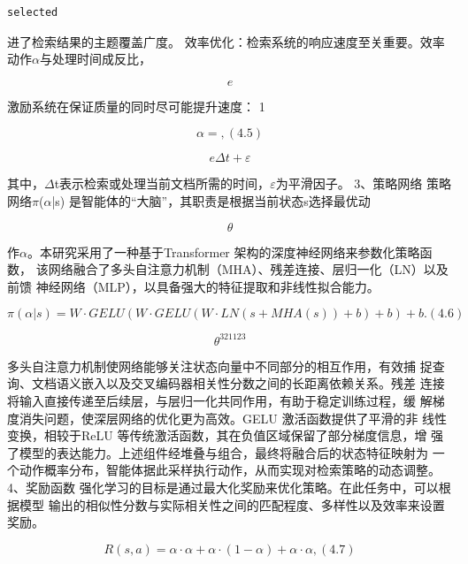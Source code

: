 \documentclass[12pt,a4paper,openright,UTF8]{ctexbook}
\begin{document}
\begin{lstlisting}
selected
\end{lstlisting}
进了检索结果的主题覆盖广度。 效率优化：检索系统的响应速度至关重要。效率动作$\alpha$与处理时间成反比，

\begin{equation*}
e
\end{equation*}

激励系统在保证质量的同时尽可能提升速度： 1

\begin{equation*}
\alpha=,(4.5)
\end{equation*}

\begin{equation*}
e\Delta t+ \varepsilon
\end{equation*}

其中，$\Delta$t表示检索或处理当前文档所需的时间，$\varepsilon$为平滑因子。 3、策略网络 策略网络$\pi$($\alpha$|s) 是智能体的“大脑”，其职责是根据当前状态s选择最优动

\begin{equation*}
\theta
\end{equation*}

作$\alpha$。本研究采用了一种基于Transformer 架构的深度神经网络来参数化策略函数， 该网络融合了多头自注意力机制（MHA）、残差连接、层归一化（LN）以及前馈 神经网络（MLP），以具备强大的特征提取和非线性拟合能力。

\begin{equation*}
\pi(\alpha|s) = W \cdot GELU(W \cdot GELU(W \cdot LN(s+ MHA(s)) + b) + b) + b. (4.6)
\end{equation*}

\begin{equation*}
\theta^321123
\end{equation*}

多头自注意力机制使网络能够关注状态向量中不同部分的相互作用，有效捕 捉查询、文档语义嵌入以及交叉编码器相关性分数之间的长距离依赖关系。残差 连接将输入直接传递至后续层，与层归一化共同作用，有助于稳定训练过程，缓 解梯度消失问题，使深层网络的优化更为高效。GELU 激活函数提供了平滑的非 线性变换，相较于ReLU 等传统激活函数，其在负值区域保留了部分梯度信息，增 强了模型的表达能力。上述组件经堆叠与组合，最终将融合后的状态特征映射为 一个动作概率分布，智能体据此采样执行动作，从而实现对检索策略的动态调整。 4、奖励函数 强化学习的目标是通过最大化奖励来优化策略。在此任务中，可以根据模型 输出的相似性分数与实际相关性之间的匹配程度、多样性以及效率来设置奖励。

\begin{equation*}
R(s, a) = \alpha\cdot\alpha + \alpha\cdot(1 −\alpha) + \alpha\cdot\alpha,(4.7)
\end{equation*}
\end{document}
